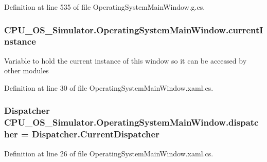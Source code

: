 Definition at line 535 of file Operating\+System\+Main\+Window.\+g.\+cs.

\hypertarget{class_c_p_u___o_s___simulator_1_1_operating_system_main_window_ac659b34226b30276331daba60ec7d439}{}
\subsubsection[{current\+Instance}]{ C\+P\+U\+\_\+\+O\+S\+\_\+\+Simulator.\+Operating\+System\+Main\+Window.\+current\+Instance\hspace{0.3cm}{\ttfamily [static]}}\label{class_c_p_u___o_s___simulator_1_1_operating_system_main_window_ac659b34226b30276331daba60ec7d439}


Variable to hold the current instance of this window so it can be accessed by other modules 



Definition at line 30 of file Operating\+System\+Main\+Window.\+xaml.\+cs.

\hypertarget{class_c_p_u___o_s___simulator_1_1_operating_system_main_window_ac0f8e9dfcaba558927c53e11815fb0fb}{}
\subsubsection[{dispatcher}]{\setlength{\rightskip}{0pt plus 5cm}Dispatcher C\+P\+U\+\_\+\+O\+S\+\_\+\+Simulator.\+Operating\+System\+Main\+Window.\+dispatcher = Dispatcher.\+Current\+Dispatcher\hspace{0.3cm}{\ttfamily [private]}}\label{class_c_p_u___o_s___simulator_1_1_operating_system_main_window_ac0f8e9dfcaba558927c53e11815fb0fb}


Definition at line 26 of file Operating\+System\+Main\+Window.\+xaml.\+cs.

